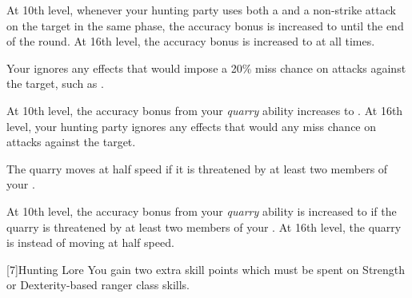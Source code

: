 {                At 10th level, whenever your hunting party uses both a  and a non-strike attack on the target in the same phase, the accuracy bonus is increased to  until the end of the round.
                At 16th level, the accuracy bonus is increased to  at all times.

                Your  ignores any effects that would impose a 20\% miss chance on attacks against the target, such as .

                At 10th level, the accuracy bonus from your \textit{quarry} ability increases to .
                At 16th level, your hunting party ignores any effects that would any miss chance on attacks against the target.

                The quarry moves at half speed if it is threatened by at least two members of your .

                At 10th level, the accuracy bonus from your \textit{quarry} ability is increased to  if the quarry is threatened by at least two members of your .
                At 16th level, the quarry is \immobilized instead of moving at half speed.
            }

            [7]{Hunting Lore} You gain two extra skill points which must be spent on Strength or Dexterity-based ranger class skills.

